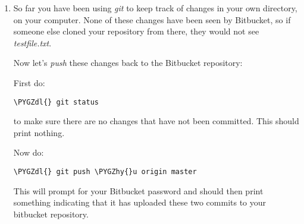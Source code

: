 \documentclass[letterpaper,10pt,english]{sphinxmanual}
\def\PYGZdl{\char`\$}
\def\PYGZhy{\char`\-}
\def\PYGZsq{\char`\'}
\renewcommand\PYGZsq{\textquotesingle}
\begin{document}
\begin{enumerate}
\begin{Verbatim}[commandchars=\\\{\}]
You are in \PYGZsq{}detached HEAD\PYGZsq{} state. You can look around, make experimental
changes and commit them, and you can discard any commits you make in this
state without impacting any branches by performing another checkout.

HEAD is now at 28a4da5... My first commit of a test file.
\end{Verbatim}

Take a look at the file, it should be back to the state with only two
lines.

Note that you don't need the full SHA-1 hash code, the first few digits
are enough to uniquely identify it.

You can go back to the most recent version with:

\begin{Verbatim}[commandchars=\\\{\}]
\PYGZdl{} git checkout master
Switched to branch \PYGZsq{}master\PYGZsq{}
\end{Verbatim}

We won't discuss branches, but unless you create a new branch, the
default name for your main branch is \emph{master} and this \emph{checkout} command
just goes back to the most recent commit.

\item {} 
So far you have been using \emph{git} to keep track of changes in your own
directory, on your computer.  None of these changes have been seen by
Bitbucket, so if someone else cloned your repository from there, they
would not see \emph{testfile.txt}.

Now let's \emph{push} these changes back to the Bitbucket repository:

First do:

\begin{Verbatim}[commandchars=\\\{\}]
\PYGZdl{} git status
\end{Verbatim}

to make sure there are no changes that have not been committed.  This
should print nothing.

Now do:

\begin{Verbatim}[commandchars=\\\{\}]
\PYGZdl{} git push \PYGZhy{}u origin master
\end{Verbatim}

This will prompt for your Bitbucket password and should then print
something indicating that it has uploaded these two commits to
your bitbucket repository.


\end{enumerate}
\end{document}
